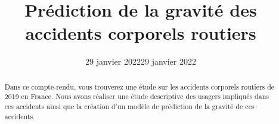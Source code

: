 \documentclass[french,]{tp}
\title{Prédiction de la gravité des accidents corporels routiers}
\author{}
\date{29 janvier 2022}
\date{29 janvier 2022}
\begin{document}

\thispagestyle{plain}
\maketitle


\begin{abstract}
Dans ce compte-rendu, vous trouverez une étude sur les accidents corporels routiers de 2019 en France.
Nous avons réaliser une étude descriptive des usagers impliqués dans ces accidents ainsi que la création d'un modèle de prédiction de la gravité de ces accidents.
\end{abstract}



{
\hypersetup{linkcolor=black}
\setcounter{tocdepth}{3}
\tableofcontents
}
\end{document}
